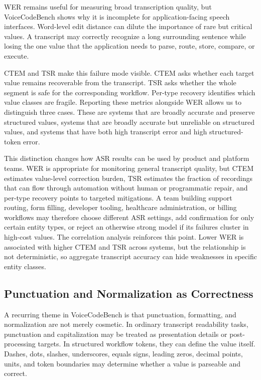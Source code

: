 \documentclass[10pt,twocolumn]{article}
\begin{document}
WER remains useful for measuring broad transcription quality, but
VoiceCodeBench shows why it is incomplete for application-facing
speech interfaces. Word-level edit distance can dilute the importance of
rare but critical values. A transcript may correctly recognize a long
surrounding sentence while losing the one value that the application
needs to parse, route, store, compare, or execute.

CTEM and TSR make this failure mode visible. CTEM asks whether each
target value remains recoverable from the transcript. TSR asks whether
the whole segment is safe for the corresponding workflow. Per-type
recovery identifies which value classes are fragile. Reporting these
metrics alongside WER allows us to distinguish three cases. These are
systems that are broadly accurate and preserve structured values,
systems that are broadly accurate but unreliable on structured values,
and systems that have both high transcript error and high
structured-token error.

This distinction changes how ASR results can be used by product and
platform teams. WER is appropriate for monitoring general transcript
quality, but CTEM estimates value-level correction burden, TSR estimates
the fraction of recordings that can flow through automation without
human or programmatic repair, and per-type recovery points to targeted
mitigations. A team building support routing, form filling, developer
tooling, healthcare administration, or billing workflows may therefore
choose different ASR settings, add confirmation for only certain entity
types, or reject an otherwise strong model if its failures cluster in
high-cost values. The correlation analysis reinforces this point. Lower
WER is associated with higher CTEM and TSR across systems, but the
relationship is not deterministic, so aggregate transcript accuracy can
hide weaknesses in specific entity classes.

\subsection{Punctuation and Normalization as
	Correctness}\label{punctuation-and-normalization-as-correctness}

A recurring theme in VoiceCodeBench is that punctuation, formatting,
and normalization are not merely cosmetic. In ordinary transcript
readability tasks, punctuation and capitalization may be treated as
presentation details or post-processing targets. In structured workflow
tokens, they can define the value itself. Dashes, dots, slashes,
underscores, equals signs, leading zeros, decimal points, units, and
token boundaries may determine whether a value is parseable and correct.
\end{document}
